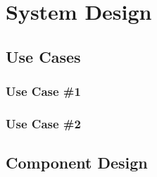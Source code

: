 \documentclass[mathserif,xcolor=dvipsnames,hyperref={bookmarks=true}]{beamer}
\begin{document}
\section{System Design}
\begin{frame}[t]
\end{frame}

    \subsection{Use Cases}

    \begin{frame}[t]
        \frametitle{Use Case \#1}
        \begin{center}
        \end{center}
    \end{frame}

    \begin{frame}[t]
        \frametitle{Use Case \#2}
        \begin{center}
        \end{center}
    \end{frame}

    \subsection{Component Design}
\end{document}

